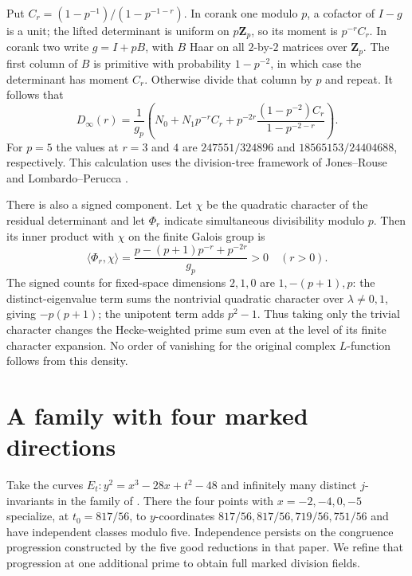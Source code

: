 \documentclass[11pt]{article}
\newcommand{\Z}{\mathbf Z}
\begin{document}
Put $C_r=(1-p^{-1})/(1-p^{-1-r})$. In corank one modulo $p$,
a cofactor of $I-g$ is a unit; the lifted determinant is uniform on
$p\Z_p$, so its moment is $p^{-r}C_r$. In corank two write
$g=I+pB$, with $B$ Haar on all $2$-by-$2$ matrices over $\Z_p$.
The first column of $B$ is primitive with probability $1-p^{-2}$,
in which case the determinant has moment $C_r$. Otherwise divide
that column by $p$ and repeat. It follows that
\[
 D_\infty(r)=\frac{1}{g_p}
 \left(N_0+N_1p^{-r}C_r+
 p^{-2r}\frac{(1-p^{-2})C_r}{1-p^{-2-r}}\right).
\]
For $p=5$ the values at $r=3$ and $4$ are $247551/324896$ and
$18565153/24404688$, respectively. This calculation uses the
division-tree framework of Jones--Rouse and Lombardo--Perucca
\cite{JR,LP}.

There is also a signed component. Let $\chi$ be the quadratic
character of the residual determinant and let $\Phi_r$ indicate
simultaneous divisibility modulo $p$. Then its inner product with
$\chi$ on the finite Galois group is
\[
 \langle\Phi_r,\chi\rangle=
 \frac{p-(p+1)p^{-r}+p^{-2r}}{g_p}>0 \quad (r>0).
\]
The signed counts for fixed-space dimensions $2,1,0$ are
$1,-(p+1),p$: the distinct-eigenvalue term sums the nontrivial
quadratic character over $\lambda\ne0,1$, giving $-p(p+1)$;
the unipotent term adds $p^2-1$. Thus taking only the trivial
character changes the Hecke-weighted prime sum even at the level
of its finite character expansion. No order of vanishing for the
original complex $L$-function follows from this density.

\section{A family with four marked directions}
Take the curves $E_t:y^2=x^3-28x+t^2-48$ and infinitely many distinct
$j$-invariants in the family of \cite{K3}. There the four points with
$x=-2,-4,0,-5$ specialize, at $t_0=817/56$, to $y$-coordinates
$817/56,817/56,719/56,751/56$ and have independent classes modulo
five. Independence persists on the congruence progression constructed
by the five good reductions in that paper. We refine that progression
at one additional prime to obtain full marked division fields.
\end{document}
